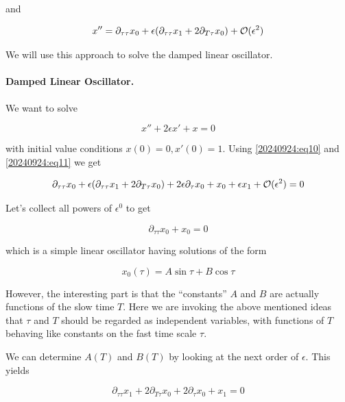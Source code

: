 and

\begin{equation}\label{20240924:eq11}
x'' = \partial_{\tau \tau} x_0 + \epsilon (\partial_{\tau \tau} x_1 + 2 \partial_{T \tau} x_0) + \mathcal{O}(\epsilon^2)
\end{equation}

We will use this approach to solve the damped linear oscillator.

\paragraph{Damped Linear Oscillator.} We want to solve

\begin{equation*}
x'' + 2 \epsilon x' + x = 0
\end{equation*}

with initial value conditions $x(0) = 0, x'(0) = 1$. Using \eqref{20240924:eq10} and \eqref{20240924:eq11} we get 

\begin{equation*}
\partial_{\tau \tau} x_0 + \epsilon ( \partial_{\tau \tau} x_1  + 2 \partial_{T \tau} x_0) + 2 \epsilon \partial_\tau x_0 + x_0  + \epsilon x_1 + \mathcal{O}(\epsilon^2) = 0
\end{equation*}

Let's collect all powers of $\epsilon^0$ to get

\begin{equation*}
\partial_{\tau \tau} x_0 + x_0 = 0
\end{equation*}

which is a simple linear oscillator having solutions of the form

\begin{equation*}
x_0(\tau) = A \sin \tau + B \cos \tau
\end{equation*}

However, the interesting part is that the “constants” $A$ and $B$ are actually functions of the slow time $T$. Here we are invoking the above mentioned ideas that $\tau$ and $T$ should be regarded as independent variables, with functions of $T$ behaving like constants on the fast time scale $\tau$.

We can determine $A(T)$ and $B(T)$ by looking at the next order of $\epsilon$. This yields

\begin{equation*}
\partial_{\tau \tau} x_1  + 2 \partial_{T \tau} x_0 + 2 \partial_\tau x_0 + x_1 = 0
\end{equation*}

